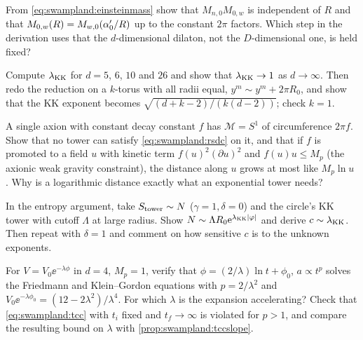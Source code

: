 \begin{exercise}[$\star$]
From \eqref{eq:swampland:einsteinmass} show that $M_{n,0}M_{0,w}$ is independent of $R$ and that
$M_{0,w}(R)=M_{w,0}(\alpha'_0/R)$ up to the constant $2\pi$ factors. Which step in the derivation
uses that the $d$-dimensional dilaton, not the $D$-dimensional one, is held fixed?
\end{exercise}

\begin{exercise}[$\star\star$]
Compute $\lambda_{\rm KK}$ for $d=5$, $6$, $10$ and $26$ and show that $\lambda_{\rm KK}\to1$ as
$d\to\infty$. Then redo the reduction on a $k$-torus with all radii equal, $y^m\sim y^m+2\pi R_0$,
and show that the KK exponent becomes $\sqrt{(d+k-2)/(k(d-2))}$; check $k=1$.
\end{exercise}

\begin{exercise}[$\star\star$]
A single axion with constant decay constant $f$ has $\mathcal M=S^1$ of circumference $2\pi f$.
Show that no tower can satisfy \eqref{eq:swampland:rsdc} on it, and that if $f$ is promoted to a
field $u$ with kinetic term $f(u)^2(\partial u)^2$ and $f(u)u\le M_p$ (the axionic weak gravity
constraint), the distance along $u$ grows at most like $M_p\ln u$
. Why is a logarithmic distance exactly what an exponential
tower needs?
\end{exercise}

\begin{exercise}[$\star\star$]
In the entropy argument, take $S_{\rm tower}\sim N$ ($\gamma=1,\delta=0$) and the circle's KK
tower with cutoff $\Lambda$ at large radius. Show $N\sim\Lambda R_0\mathrm{e}^{\lambda_{\rm KK}|\varphi|}$
and derive $c\sim\lambda_{\rm KK}$. Then repeat with $\delta=1$ and comment on how sensitive $c$ is
to the unknown exponents.
\end{exercise}

\begin{exercise}[$\star\star$]
For $V=V_0\ee^{-\lambda\phi}$ in $d=4$, $M_p=1$, verify that $\phi=(2/\lambda)\ln t+\phi_0$,
$a\propto t^{p}$ solves the Friedmann and Klein--Gordon equations with $p=2/\lambda^2$ and
$V_0\ee^{-\lambda\phi_0}=(12-2\lambda^2)/\lambda^4$. For which $\lambda$ is the expansion
accelerating? Check that \eqref{eq:swampland:tcc} with $t_i$ fixed and $t_f\to\infty$ is violated
for $p>1$, and compare the resulting bound on $\lambda$ with \cref{prop:swampland:tccslope}.
\end{exercise}

